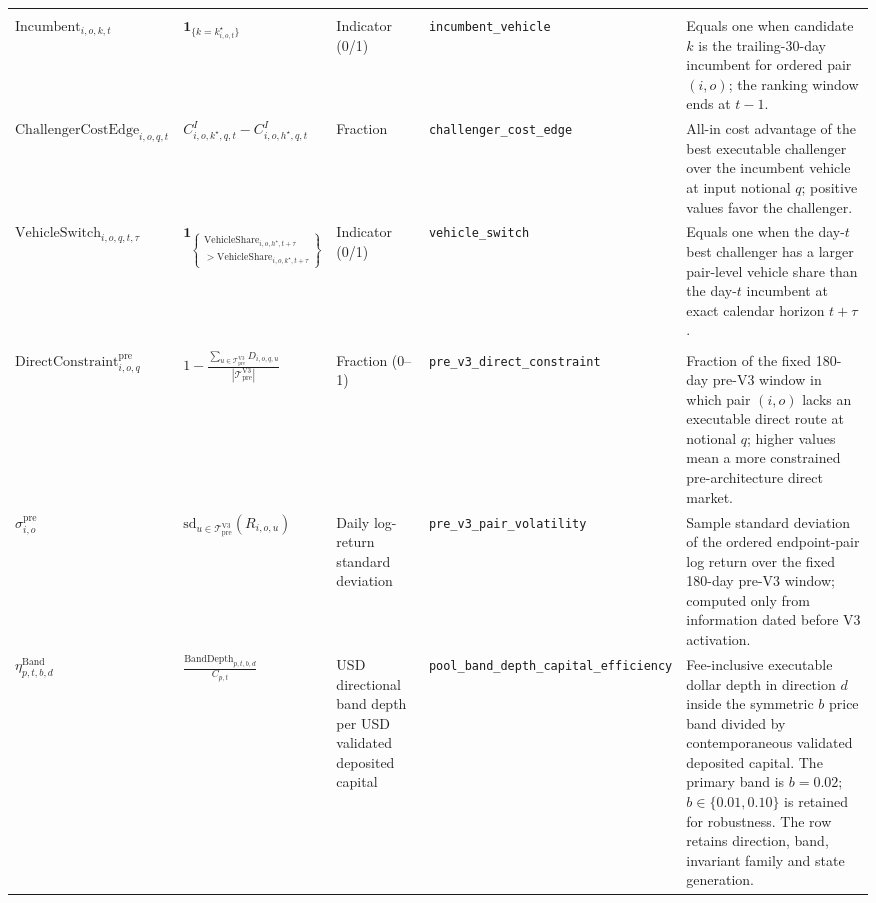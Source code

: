 \begin{tabularx}{\linewidth}{@{}>{\raggedright\arraybackslash}X>{\raggedright\arraybackslash}Xl>{\raggedright\arraybackslash}X>{\raggedright\arraybackslash}X@{}}
\addlinespace
\multicolumn{5}{@{}l}{\textit{Persistence and displacement measures}} \\
$\mathrm{Incumbent}_{i,o,k,t}$ & $\mathbf{1}_{\{k=k^\star_{i,o,t}\}}$ & Indicator (0/1) & \texttt{incumbent\_\allowbreak{}vehicle} & Equals one when candidate $k$ is the trailing-30-day incumbent for ordered pair $(i,o)$; the ranking window ends at $t-1$. \\
$\mathrm{ChallengerCostEdge}_{i,o,q,t}$ & $C^I_{i,o,k^\star,q,t}-C^I_{i,o,h^\star,q,t}$ & Fraction & \texttt{challenger\_\allowbreak{}cost\_\allowbreak{}edge} & All-in cost advantage of the best executable challenger over the incumbent vehicle at input notional $q$; positive values favor the challenger. \\
$\mathrm{VehicleSwitch}_{i,o,q,t,\tau}$ & $\displaystyle\mathbf{1}_{\left\{\begin{array}{c}\mathrm{VehicleShare}_{i,o,h^\star,t+\tau}\\{}>\mathrm{VehicleShare}_{i,o,k^\star,t+\tau}\end{array}\right\}}$ & Indicator (0/1) & \texttt{vehicle\_\allowbreak{}switch} & Equals one when the day-$t$ best challenger has a larger pair-level vehicle share than the day-$t$ incumbent at exact calendar horizon $t+\tau$. \\
\addlinespace
\multicolumn{5}{@{}l}{\textit{Execution-architecture measures}} \\
$\mathrm{DirectConstraint}^{\mathrm{pre}}_{i,o,q}$ & $\displaystyle 1-\frac{\sum_{u\in\mathcal T^{\mathrm{V3}}_{\mathrm{pre}}}D_{i,o,q,u}}{|\mathcal T^{\mathrm{V3}}_{\mathrm{pre}}|}$ & Fraction (0--1) & \texttt{pre\_\allowbreak{}v3\_\allowbreak{}direct\_\allowbreak{}constraint} & Fraction of the fixed 180-day pre-V3 window in which pair $(i,o)$ lacks an executable direct route at notional $q$; higher values mean a more constrained pre-architecture direct market. \\
$\sigma^{\mathrm{pre}}_{i,o}$ & $\displaystyle\mathrm{sd}_{u\in\mathcal T^{\mathrm{V3}}_{\mathrm{pre}}}(R_{i,o,u})$ & Daily log-return standard deviation & \texttt{pre\_\allowbreak{}v3\_\allowbreak{}pair\_\allowbreak{}volatility} & Sample standard deviation of the ordered endpoint-pair log return over the fixed 180-day pre-V3 window; computed only from information dated before V3 activation. \\
$\eta^{\mathrm{Band}}_{p,t,b,d}$ & $\displaystyle\frac{\mathrm{BandDepth}_{p,t,b,d}}{C_{p,t}}$ & USD directional band depth per USD validated deposited capital & \texttt{pool\_\allowbreak{}band\_\allowbreak{}depth\_\allowbreak{}capital\_\allowbreak{}efficiency} & Fee-inclusive executable dollar depth in direction $d$ inside the symmetric $b$ price band divided by contemporaneous validated deposited capital. The primary band is $b=0.02$; $b\in\{0.01,0.10\}$ is retained for robustness. The row retains direction, band, invariant family and state generation. \\

\end{tabularx}
